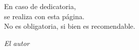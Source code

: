 
\cleardoublepage
\thispagestyle{empty} %

\begin{minipage}[c][\textheight][c]{\textwidth} %
\raggedleft %

En caso de dedicatoria, \\
se realiza con esta página.\\
No es obligatoria, si bien es recomendable.

\bigskip

\emph{El autor}

\end{minipage}

\blankpage